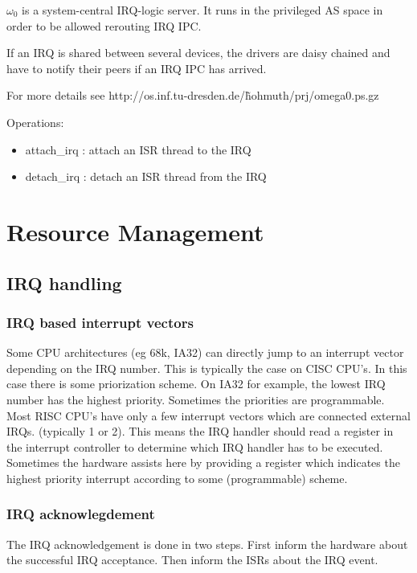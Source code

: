 $\omega_0$ is a system-central IRQ-logic server. It runs in the
privileged AS space in order to be allowed rerouting IRQ IPC.

If an IRQ is shared between several devices, the drivers are daisy
chained and have to notify their peers if an IRQ IPC has arrived.

For more details see http://os.inf.tu-dresden.de/\~hohmuth/prj/omega0.ps.gz

Operations:
\begin{itemize}
\item attach\_irq : attach an ISR thread to the IRQ 
\item detach\_irq : detach an ISR thread from the IRQ
\end{itemize}


\section{Resource Management}

\subsection{IRQ handling}

\subsubsection{IRQ based interrupt vectors}

Some CPU architectures (eg 68k, IA32) can directly jump to an
interrupt vector depending on the IRQ number. This is typically the
case on CISC CPU's. In this case there is some priorization scheme. On
IA32 for example, the lowest IRQ number has the highest priority.
Sometimes the priorities are programmable.  Most RISC CPU's have only
a few interrupt vectors which are connected external IRQs. (typically
1 or 2). This means the IRQ handler should read a register in the
interrupt controller to determine which IRQ handler has to be
executed.  Sometimes the hardware assists here by providing a register
which indicates the highest priority interrupt according to some
(programmable) scheme.

\subsubsection{IRQ acknowlegdement}

The IRQ acknowledgement is done in two steps. First inform the
hardware about the successful IRQ acceptance. Then inform the ISRs
about the IRQ event.

